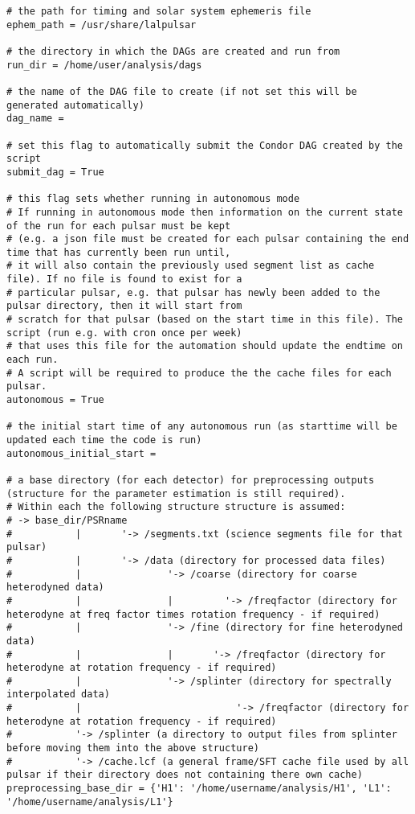 \begin{lstlisting}[frame=single]
# the path for timing and solar system ephemeris file
ephem_path = /usr/share/lalpulsar

# the directory in which the DAGs are created and run from
run_dir = /home/user/analysis/dags

# the name of the DAG file to create (if not set this will be generated automatically)
dag_name =

# set this flag to automatically submit the Condor DAG created by the script
submit_dag = True

# this flag sets whether running in autonomous mode
# If running in autonomous mode then information on the current state of the run for each pulsar must be kept
# (e.g. a json file must be created for each pulsar containing the end time that has currently been run until,
# it will also contain the previously used segment list as cache file). If no file is found to exist for a
# particular pulsar, e.g. that pulsar has newly been added to the pulsar directory, then it will start from
# scratch for that pulsar (based on the start time in this file). The script (run e.g. with cron once per week)
# that uses this file for the automation should update the endtime on each run.
# A script will be required to produce the the cache files for each pulsar.
autonomous = True

# the initial start time of any autonomous run (as starttime will be updated each time the code is run)
autonomous_initial_start =

# a base directory (for each detector) for preprocessing outputs (structure for the parameter estimation is still required).
# Within each the following structure structure is assumed:
# -> base_dir/PSRname
#           |       '-> /segments.txt (science segments file for that pulsar)
#           |       '-> /data (directory for processed data files)
#           |               '-> /coarse (directory for coarse heterodyned data)
#           |               |         '-> /freqfactor (directory for heterodyne at freq factor times rotation frequency - if required)
#           |               '-> /fine (directory for fine heterodyned data)
#           |               |       '-> /freqfactor (directory for heterodyne at rotation frequency - if required)
#           |               '-> /splinter (directory for spectrally interpolated data)
#           |                           '-> /freqfactor (directory for heterodyne at rotation frequency - if required)
#           '-> /splinter (a directory to output files from splinter before moving them into the above structure)
#           '-> /cache.lcf (a general frame/SFT cache file used by all pulsar if their directory does not containing there own cache)
preprocessing_base_dir = {'H1': '/home/username/analysis/H1', 'L1': '/home/username/analysis/L1'}


\end{lstlisting}
